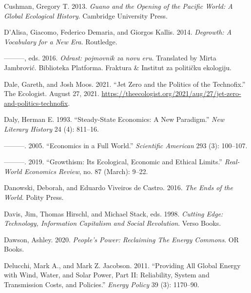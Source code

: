 \documentclass[a4paper, nobind]{templates/ociamthesis}
\newlength{\cslhangindent}
\newenvironment{CSLReferences}[2] %
 {%
  \setlength{\parindent}{0pt}
  \ifodd #1
  \let\oldpar\par
  \def\par{\hangindent=\cslhangindent\oldpar}
  \fi
  \setlength{\parskip}{1mm}
  \setlength{\baselineskip}{6mm}
 }%
 {}
\begin{document}
\begin{CSLReferences}{1}{0}
\leavevmode{}%
Cushman, Gregory T. 2013. \emph{Guano and the Opening of the {Pacific} World: A Global Ecological History}. {Cambridge University Press}.

\leavevmode{}%
D'Alisa, Giacomo, Federico Demaria, and Giorgos Kallis. 2014. \emph{Degrowth: {A Vocabulary} for a {New Era}}. {Routledge}.

\leavevmode{}%
---------, eds. 2016. \emph{Odrast: pojmovnik za novu eru}. Translated by Mirta Jambrović. Biblioteka Platforma. {Fraktura \& Institut za političku ekologiju}.

\leavevmode{}%
Dale, Gareth, and Josh Moos. 2021. {``Jet {Zero} and the Politics of the Technofix.''} {The Ecologist}. August 27, 2021. \url{https://theecologist.org/2021/aug/27/jet-zero-and-politics-technofix}.

\leavevmode{}%
Daly, Herman E. 1993. {``Steady-{State Economics}: {A New Paradigm}.''} \emph{New Literary History} 24 (4): 811--16.

\leavevmode{}%
---------. 2005. {``Economics in a Full World.''} \emph{Scientific American} 293 (3): 100--107.

\leavevmode{}%
---------. 2019. {``Growthism: Its Ecological, Economic and Ethical Limits.''} \emph{Real-World Economics Review}, no. 87 (March): 9--22.

\leavevmode{}%
Danowski, Deborah, and Eduardo Viveiros de Castro. 2016. \emph{The {Ends} of the {World}}. {Polity Press}.

\leavevmode{}%
Davis, Jim, Thomas Hirschl, and Michael Stack, eds. 1998. \emph{Cutting {Edge}: {Technology}, {Information Capitalism} and {Social Revolution}}. {Verso Books}.

\leavevmode{}%
Dawson, Ashley. 2020. \emph{People's {Power}: {Reclaiming The Energy Commons}}. {OR Books}.

\leavevmode{}%
Delucchi, Mark A., and Mark Z. Jacobson. 2011. {``Providing All Global Energy with Wind, Water, and Solar Power, {Part II}: {Reliability}, System and Transmission Costs, and Policies.''} \emph{Energy Policy} 39 (3): 1170--90.


\end{CSLReferences}
\end{document}
